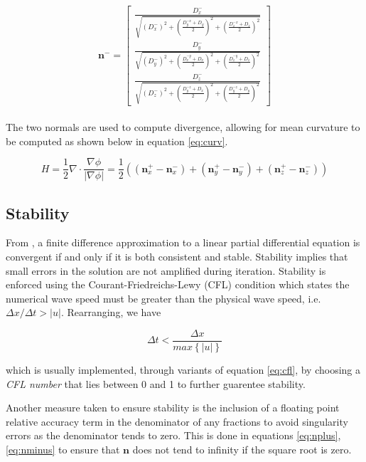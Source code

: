 \begin{equation}
\textbf{n}^- = \left[
  \begin{array}{ c }
     \frac{D_x^-}{\sqrt{(D_x^-)^2 + {\left(\frac{D_y^{-x}+D_y}{2}\right)}^2 +{\left(\frac{D_z^{-x}+D_z}{2}\right)}^2  }}  \\[2em]
     \frac{D_y^-}{\sqrt{(D_y^-)^2 + {\left(\frac{D_x^{-y}+D_x}{2}\right)}^2 +{\left(\frac{D_z^{-y}+D_z}{2}\right)}^2  }}  \\[2em]
     \frac{D_z^-}{\sqrt{(D_z^-)^2 + {\left(\frac{D_y^{-z}+D_x}{2}\right)}^2 +{\left(\frac{D_y^{-z}+D_y}{2}\right)}^2  }}  
  \end{array} \right]
\label{eq:nminus}
\end{equation}
\\
The two normals are used to compute divergence, allowing for mean curvature to be computed as shown below in equation \eqref{eq:curv}.

\begin{equation}
H = \frac{1}{2}\nabla\cdot\frac{\nabla\phi}{|\nabla\phi|} = \frac{1}{2}((\textbf{n}_x^+ - \textbf{n}_x^-)+(\textbf{n}_y^+ - \textbf{n}_y^-)+(\textbf{n}_z^+ - \textbf{n}_z^-))
\label{eq:curv}
\end{equation}


\subsection{Stability}\label{stability}
From \cite{osher2003lsm}, a finite difference approximation to a linear partial differential equation is convergent if and only if it is both consistent and stable. Stability implies that small errors in the solution are not amplified during iteration. Stability is enforced using the Courant-Friedreichs-Lewy (CFL) condition which states the numerical wave speed must be greater than the physical wave speed, i.e. $\Delta x/\Delta t>|u|$. Rearranging, we have

\begin{equation}
\Delta t < \frac{\Delta x}{max\left\{|u|\right\}}
\label{eq:cfl}
\end{equation}

which is usually implemented, through variants of equation \eqref{eq:cfl}, by choosing a \textit{CFL number} that lies between 0 and 1 to further guarentee stability.

Another measure taken to ensure stability is the inclusion of a floating point relative accuracy term in the denominator of any fractions to avoid singularity errors as the denominator tends to zero. This is done in equations \eqref{eq:nplus},\eqref{eq:nminus} to ensure that $\textbf{n}$ does not tend to infinity if the square root is zero.

